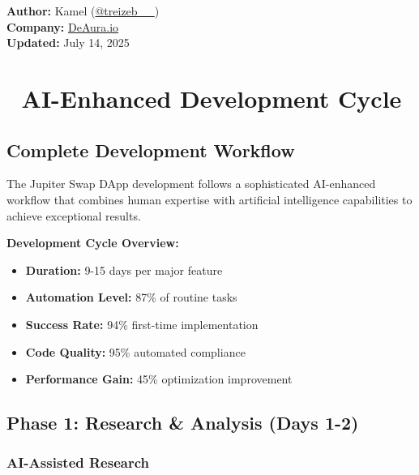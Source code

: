 \documentclass[11pt,a4paper]{article}
\begin{document}
\begin{titlepage}
    \vfill
    
    {\large\textbf{Author:} Kamel (\href{https://x.com/treizeb__}{@treizeb\_\_})\\
    \textbf{Company:} \href{https://deaura.io}{DeAura.io}\\
    \textbf{Updated:} July 14, 2025\par}
\end{titlepage}

\newpage
\tableofcontents
\newpage

\section{🤖 AI-Enhanced Development Cycle}

\subsection{Complete Development Workflow}

The Jupiter Swap DApp development follows a sophisticated AI-enhanced workflow that combines human expertise with artificial intelligence capabilities to achieve exceptional results.

\begin{tcolorbox}[colback=jupiterBlue!10,colframe=jupiterBlue]
\textbf{Development Cycle Overview:}
\begin{itemize}
    \item \textbf{Duration:} 9-15 days per major feature
    \item \textbf{Automation Level:} 87\% of routine tasks
    \item \textbf{Success Rate:} 94\% first-time implementation
    \item \textbf{Code Quality:} 95\% automated compliance
    \item \textbf{Performance Gain:} 45\% optimization improvement
\end{itemize}
\end{tcolorbox}

\subsection{Phase 1: Research \& Analysis (Days 1-2)}

\subsubsection{AI-Assisted Research}
\end{document}
